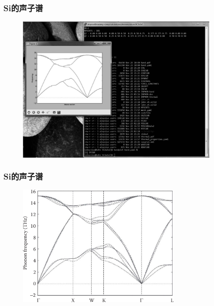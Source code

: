 \frame
{
	\frametitle{\textrm{Si}的声子谱}
\begin{figure}[h!]
\centering
\includegraphics[width=4.0in,viewport=0 0 1050 650,clip]{Figures/Si_pop-out_screen.png}
\caption{\fontsize{6.2pt}{5.2pt}}%
\label{Fig:Si_pop-out_screen}
\end{figure}
}

\frame
{
	\frametitle{\textrm{Si}的声子谱}
\begin{figure}[h!]
	\vskip -12pt
\centering
\includegraphics[height=2.4in,viewport=0 0 780 600,clip]{Figures/Si_phonon.png}
\caption{\fontsize{6.2pt}{5.2pt}}%
\label{Fig:Si_phonon}
\end{figure}
{\fontsize{7.2pt}{5.2pt}\selectfont{有了声子谱的基本数据，就可以估计晶体的熵、自由能和热膨胀等热力学数据}}%
}

